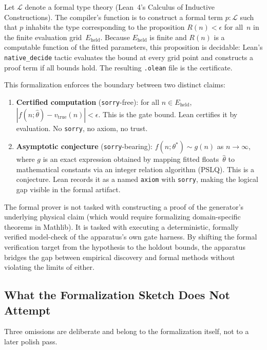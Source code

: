 \documentclass[11pt]{article}
\begin{document}
Let $\mathcal{L}$ denote a formal type theory (Lean~4's Calculus of Inductive Constructions). The compiler's function is to construct a formal term $p : \mathcal{L}$ such that $p$ inhabits the type corresponding to the proposition $R(n) < \epsilon$ for all~$n$ in the finite evaluation grid~$E_{\text{held}}$. Because $E_{\text{held}}$ is finite and $R(n)$ is a computable function of the fitted parameters, this proposition is decidable: Lean's \texttt{native\_decide} tactic evaluates the bound at every grid point and constructs a proof term if all bounds hold. The resulting \texttt{.olean} file is the certificate.

This formalization enforces the boundary between two distinct claims:

\begin{enumerate}
\item \textbf{Certified computation} (\texttt{sorry}-free): for all $n \in E_{\text{held}}$, $|f(n; \hat{\theta}) - v_{\text{true}}(n)| < \epsilon$. This is the gate bound. Lean certifies it by evaluation. No \texttt{sorry}, no axiom, no trust.

\item \textbf{Asymptotic conjecture} (\texttt{sorry}-bearing): $f(n; \theta^*) \sim g(n)$ as $n \to \infty$, where $g$ is an exact expression obtained by mapping fitted floats~$\hat{\theta}$ to mathematical constants via an integer relation algorithm (PSLQ). This is a conjecture. Lean records it as a named \texttt{axiom} with \texttt{sorry}, making the logical gap visible in the formal artifact.
\end{enumerate}

The formal prover is not tasked with constructing a proof of the generator's underlying physical claim (which would require formalizing domain-specific theorems in Mathlib). It is tasked with executing a deterministic, formally verified model-check of the apparatus's own gate harness. By shifting the formal verification target from the hypothesis to the holdout bounds, the apparatus bridges the gap between empirical discovery and formal methods without violating the limits of either.

\subsection{What the Formalization Sketch Does Not Attempt}

Three omissions are deliberate and belong to the formalization itself, not to a later polish pass.
\end{document}
